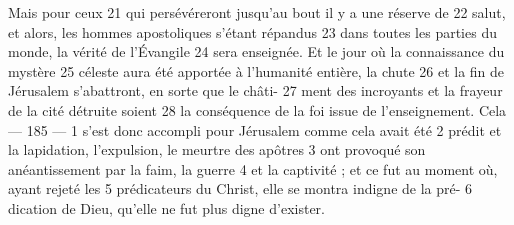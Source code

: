 Mais pour ceux	 
21	 	qui persévéreront jusqu'au bout il y a une réserve de	 
22	 	salut, et alors, les hommes apostoliques s'étant répandus	 
23	 	dans toutes les parties du monde, la vérité de l'Évangile	 
24	 	sera enseignée. Et le jour où la connaissance du mystère	 
25	 	céleste aura été apportée à l'humanité entière, la chute	 
26	 	et la fin de Jérusalem s'abattront, en sorte que le châti-	 
27	 	ment des incroyants et la frayeur de la cité détruite soient	 
28	 	la conséquence de la foi issue de l'enseignement. Cela	 
 	--- 185 ---	 
1	 	s'est donc accompli pour Jérusalem comme cela avait été	 
2	 	prédit et la lapidation, l'expulsion, le meurtre des apôtres	 
3	 	ont provoqué son anéantissement par la faim, la guerre	 
4	 	et la captivité ; et ce fut au moment où, ayant rejeté les	 
5	 	prédicateurs du Christ, elle se montra indigne de la pré-	 
6	 	dication de Dieu, qu'elle ne fut plus digne d'exister.